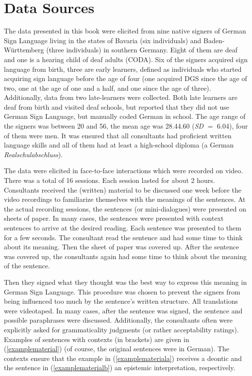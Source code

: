 
\section{Data Sources}\label{methods}
The data presented in this book were elicited from nine native signers of German Sign Language living in the states of Bavaria (six individuals) and Baden-W\"urttemberg (three individuals) in southern Germany. Eight of them are deaf and one is a hearing child of deaf adults (CODA). Six of the signers acquired sign language from birth, three are early learners, defined as individuals who started acquiring sign language before the age of four (one acquired DGS since the age of two, one at the age of one and a half, and one since the age of three). Additionally, data from two late-learners were collected. Both late learners are deaf from birth and visited deaf schools, but reported that they did not use German Sign Language, but manually coded German in school. The age range of the signers was between 20 and 56, the mean age was 28.44.60 (\textit{SD} $=$ 6.04), four of them were men. It was ensured that all consultants had proficient written language skills and all of them had at least a high-school diploma (a German \textit{Realschulabschluss}). 



The data were elicited in face-to-face interactions which were recorded on video. There was a total of 16 sessions. Each session lasted for about 2 hours. Consultants received the (written) material to be discussed one week before the video recordings to familiarize themselves with the meanings of the sentences. At the actual recording sessions, the sentences (or mini-dialogues) were presented on sheets of paper. In many cases, the sentences were presented with context sentences to arrive at the desired reading. Each sentence was presented to them for a few seconds. The consultant read the sentence and had some time to think about its meaning. Then the sheet of paper was covered up. After the sentence was covered up, the consultants again had some time to think about the meaning of the sentence. 

Then they signed what they thought was the best way to express this meaning in German Sign Language. This procedure was chosen to prevent the  signers  from  being  influenced  too  much  by  the  sentence's  written  structure. All translations were videotaped. In many cases, after the sentence was signed, the sentence and possible paraphrases were discussed. Additionally, the  consultants often were explicitly asked for grammaticality judgments (or rather acceptability ratings). Examples of sentences with contexts (in brackets) are given in (\ref{examplematerial}) (of course, the original sentences were in German). The contexts ensure that the example in (\ref{examplemateriala}) receives a deontic and the sentence in (\ref{examplematerialb}) an epistemic interpretation, respectively.

